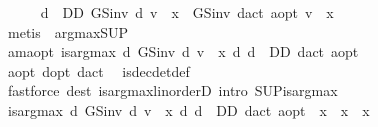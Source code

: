 \begin{isabellebody}
\ \ \ \ \isamarkupfalse%
\ {\isachardoublequoteopen}{\isacharparenleft}{\kern0pt}{\isasymSqunion}d\ {\isasymin}\ D\isactrlsub D{\isachardot}{\kern0pt}\ GS{\isacharunderscore}{\kern0pt}inv\ d\ v\ {\isachardollar}{\kern0pt}\ x{\isacharparenright}{\kern0pt}\ {\isacharequal}{\kern0pt}\ GS{\isacharunderscore}{\kern0pt}inv\ {\isacharparenleft}{\kern0pt}d{\isacharunderscore}{\kern0pt}act\ a{\isacharunderscore}{\kern0pt}opt{\isacharparenright}{\kern0pt}\ v\ {\isachardollar}{\kern0pt}\ x{\isachardoublequoteclose}\isanewline
\ \ \ \ \ \ \isamarkupfalse%
\ {\isacharparenleft}{\kern0pt}metis\ {\isacharasterisk}{\kern0pt}\ arg{\isacharunderscore}{\kern0pt}max{\isacharunderscore}{\kern0pt}SUP{\isacharparenright}{\kern0pt}\isanewline
\ \ \ \ \isamarkupfalse%
\ am{\isacharunderscore}{\kern0pt}a{\isacharunderscore}{\kern0pt}opt{\isacharcolon}{\kern0pt}\ {\isachardoublequoteopen}is{\isacharunderscore}{\kern0pt}arg{\isacharunderscore}{\kern0pt}max\ {\isacharparenleft}{\kern0pt}{\isasymlambda}d{\isachardot}{\kern0pt}\ GS{\isacharunderscore}{\kern0pt}inv\ d\ v\ {\isachardollar}{\kern0pt}\ x{\isacharparenright}{\kern0pt}\ {\isacharparenleft}{\kern0pt}{\isasymlambda}d{\isachardot}{\kern0pt}\ d\ {\isasymin}\ D\isactrlsub D{\isacharparenright}{\kern0pt}\ {\isacharparenleft}{\kern0pt}d{\isacharunderscore}{\kern0pt}act\ a{\isacharunderscore}{\kern0pt}opt{\isacharparenright}{\kern0pt}{\isachardoublequoteclose}\isanewline
\ \ \ \ \ \ \isamarkupfalse%
\ a{\isacharunderscore}{\kern0pt}opt\ d{\isacharunderscore}{\kern0pt}opt\ d{\isacharunderscore}{\kern0pt}act\ \isamarkupfalse%
\ is{\isacharunderscore}{\kern0pt}dec{\isacharunderscore}{\kern0pt}det{\isacharunderscore}{\kern0pt}def\isanewline
\ \ \ \ \ \ \isamarkupfalse%
\ {\isacharparenleft}{\kern0pt}fastforce\ dest{\isacharcolon}{\kern0pt}\ is{\isacharunderscore}{\kern0pt}arg{\isacharunderscore}{\kern0pt}max{\isacharunderscore}{\kern0pt}linorderD{\isacharparenleft}{\kern0pt}{}{\isacharparenright}{\kern0pt}\ intro{\isacharbang}{\kern0pt}{\isacharcolon}{\kern0pt}\ SUP{\isacharunderscore}{\kern0pt}is{\isacharunderscore}{\kern0pt}arg{\isacharunderscore}{\kern0pt}max{\isacharparenright}{\kern0pt}\isanewline
\ \ \ \ \isamarkupfalse%
\ {\isachardoublequoteopen}is{\isacharunderscore}{\kern0pt}arg{\isacharunderscore}{\kern0pt}max\ {\isacharparenleft}{\kern0pt}{\isasymlambda}d{\isachardot}{\kern0pt}\ GS{\isacharunderscore}{\kern0pt}inv\ d\ v\ {\isachardollar}{\kern0pt}\ x{\isacharprime}{\kern0pt}{\isacharparenright}{\kern0pt}\ {\isacharparenleft}{\kern0pt}{\isasymlambda}d{\isachardot}{\kern0pt}\ d\ {\isasymin}\ D\isactrlsub D{\isacharparenright}{\kern0pt}\ {\isacharparenleft}{\kern0pt}d{\isacharunderscore}{\kern0pt}act\ a{\isacharunderscore}{\kern0pt}opt{\isacharparenright}{\kern0pt}{\isachardoublequoteclose}\ \ {\isachardoublequoteopen}x{\isacharprime}{\kern0pt}\ {\isacharless}{\kern0pt}\ x{\isachardoublequoteclose}\ \ x{\isacharprime}{\kern0pt}\isanewline

\end{isabellebody}

